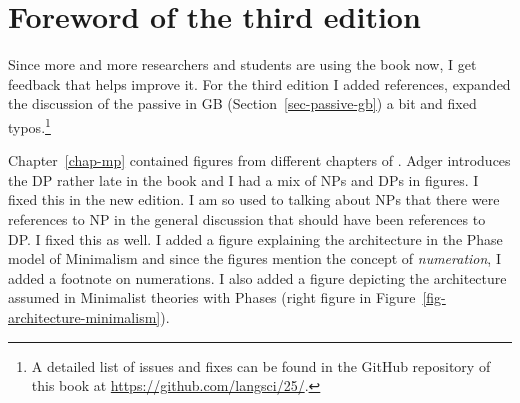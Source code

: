 
\section*{Foreword of the third edition}











Since more and more researchers and students are using the book now, I get feedback that helps
improve it. For the third edition I added references, expanded the discussion of the passive in GB (Section~\ref{sec-passive-gb})
a bit and fixed typos.\footnote{%
  A detailed list of issues and fixes can be found in the GitHub repository of this book at
  \url{https://github.com/langsci/25/}.%
}

Chapter~\ref{chap-mp} contained figures from different chapters of . Adger
introduces the DP rather late in the book and I had a mix of NPs and DPs in figures. I fixed this in
the new edition. I am so used to talking about NPs that there were references to NP in the general
discussion that should have been references to DP. I fixed this as well. I added a figure explaining
the architecture in the Phase model of Minimalism and since the figures mention the concept of
\emph{numeration}, I added a footnote on numerations. I also added a figure depicting the
architecture assumed in Minimalist theories with Phases (right figure in Figure~\ref{fig-architecture-minimalism}).

